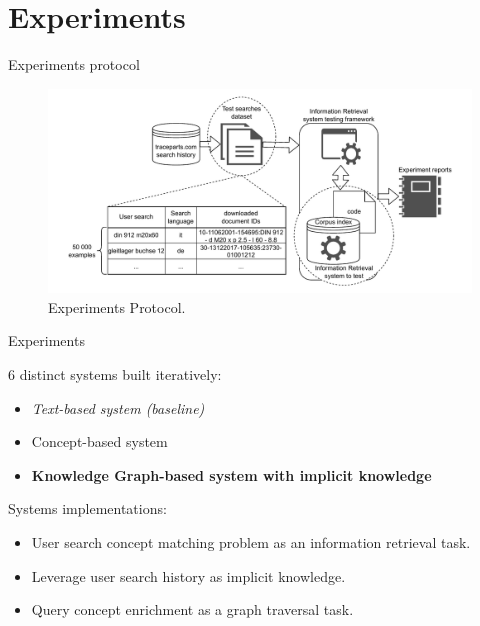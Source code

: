 \section{Experiments}

\begin{frame}{Experiments protocol}

    \begin{figure} [H]
        \begin{center}
            \includegraphics[scale=0.55]{images/tp-search-expe-setting.pdf} 
            \caption{Experiments Protocol.} 
        \end{center}
    \end{figure}

\end{frame}

\begin{frame}{Experiments}

    6 distinct systems built iteratively:
    \begin{itemize}
        \item \emph{Text-based system (baseline)}
        \item Concept-based system
        \item \textbf{Knowledge Graph-based system with implicit knowledge}
    \end{itemize}
    
    Systems implementations:
    \begin{itemize}
        \item User search concept matching problem as an information retrieval task.
        \item Leverage user search history as implicit knowledge.
        \item Query concept enrichment as a graph traversal task.
    \end{itemize}

\end{frame}

